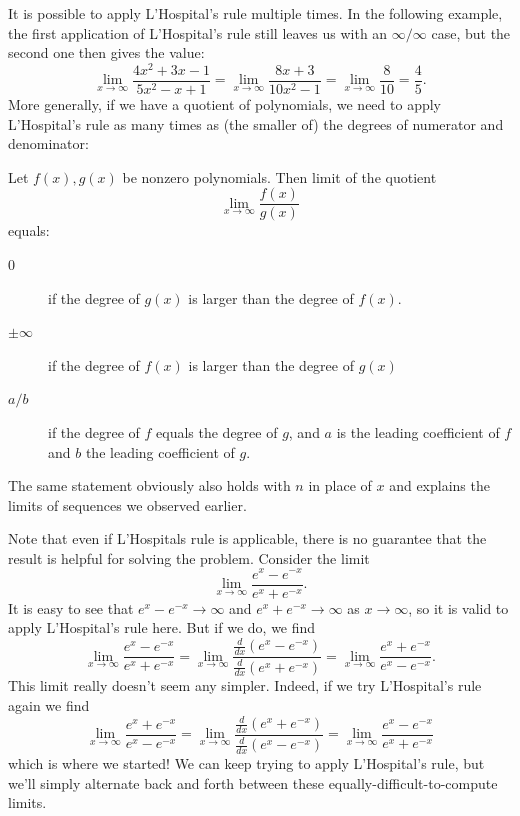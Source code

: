 It is possible to apply L'Hospital's rule multiple times. In the following
example, the first application of L'Hospital's rule still leaves us with an
$\infty/\infty$ case, but the second one then gives the value:
\[
\lim_{x\to\infty}\frac{4x^2+3x-1}{5x^2-x+1}
=\lim_{x\to\infty}\frac{8x+3}{10x^2-1}
=\lim_{x\to\infty}\frac{8}{10}=\frac{4}{5}.
\]
More generally, if we have a quotient of polynomials, we need to apply 
L'Hospital's rule as many times as (the smaller of) the degrees of numerator
and denominator:
\begin{thm}
Let $f(x),g(x)$ be nonzero polynomials. Then limit of the quotient
\[
\lim_{x\to\infty}\frac{f(x)}{g(x)}
\]
equals:
\begin{description}
\item[$0$] if the degree of $g(x)$ is larger than the degree of $f(x)$.\\
\item[$\pm\infty$] if the degree of $f(x)$ is larger than the degree of
$g(x)$\\
\item[$a/b$] if the degree of $f$ equals the degree of $g$, and $a$ is the
leading coefficient of $f$ and $b$ the leading coefficient of $g$.
\end{description}
\end{thm}
The same statement obviously also holds with $n$ in place of $x$ and
explains the limits of sequences we observed earlier.

\begin{bsp}
Note that even if L'Hospitals rule is applicable, there is no guarantee that
the result is helpful for solving the problem.
Consider the limit
\[\lim_{x \to \infty}\frac{e^x-e^{-x}}{e^x+e^{-x}}.\]
It is easy to see that $e^x-e^{-x} \to \infty$ and $e^x+e^{-x} \to \infty$ as
$x \to \infty$, so it is valid to apply L'Hospital's rule here. But if we do,
we find
\[
\lim_{x \to \infty}\frac{e^x-e^{-x}}{e^x+e^{-x}} = \lim_{x \to
\infty}\frac{\frac{d}{dx}(e^x-e^{-x})}{\frac{d}{dx}(e^x+e^{-x})} = \lim_{x
\to \infty}\frac{e^x+e^{-x}}{e^x-e^{-x}}.
\]
This limit really doesn't seem
any simpler. Indeed, if we try L'Hospital's rule again we find
\[
\lim_{x \to
\infty}\frac{e^x+e^{-x}}{e^x-e^{-x}} = \lim_{x \to
\infty}\frac{\frac{d}{dx}(e^x+e^{-x})}{\frac{d}{dx}(e^x-e^{-x})} = \lim_{x
\to \infty}\frac{e^x-e^{-x}}{e^x+e^{-x}}
\]
which is where we started! We can
keep trying to apply L'Hospital's rule, but we'll simply alternate back and
forth between these equally-difficult-to-compute limits. 
\end{bsp}

